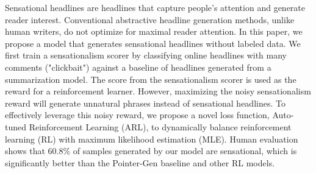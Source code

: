 Sensational headlines are headlines that capture people's attention and generate reader interest. Conventional abstractive headline generation methods, unlike human writers, do not optimize for maximal reader attention. In this paper, we propose a model that generates sensational headlines without labeled data. We first train a sensationalism scorer by classifying online headlines with many comments ("clickbait") against a baseline of headlines generated from a summarization model. The score from the sensationalism scorer is used as the reward for a reinforcement learner. However, maximizing the noisy sensationalism reward will generate unnatural phrases instead of sensational headlines. To effectively leverage this noisy reward, we propose a novel loss function, Auto-tuned Reinforcement Learning (ARL), to dynamically balance reinforcement learning (RL) with maximum likelihood estimation (MLE). Human evaluation shows that  60.8\% of samples generated by our model are sensational, which is significantly better than the Pointer-Gen baseline and other RL models.